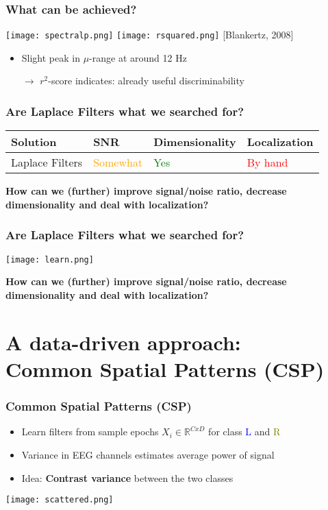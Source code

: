 \documentclass{beamer}
\begin{document}
\begin{frame}
\frametitle{What can be achieved?}
\texttt{[image: spectralp.png]}
\texttt{[image: rsquared.png]}
{\tiny [Blankertz, 2008]}
\begin{itemize}
 	\item Slight peak in $\mu$-range at around 12 Hz
 	\item[$\rightarrow$] $r^2$-score indicates: already useful discriminability
\end{itemize}
\end{frame}

\begin{frame}
\frametitle{Are Laplace Filters what we searched for?}

	\begin{center}
    \begin{tabular}{ | l | l | l | p{3cm} |}
    \hline
   	Solution & SNR & Dimensionality & Localization \\ \hline
    Laplace Filters & \textcolor{orange}{Somewhat} & \textcolor{green}{Yes} & \textcolor{red}{By hand} \\ \hline
    \end{tabular}
\end{center}

	{\bf How can we (further) improve signal/noise ratio, decrease dimensionality and deal with localization?}

\end{frame}

\begin{frame}
\frametitle{Are Laplace Filters what we searched for?}

	\begin{center}
   \texttt{[image: learn.png]}
\end{center}

	{\bf How can we (further) improve signal/noise ratio, decrease dimensionality and deal with localization?}

\end{frame}

\section{A data-driven approach: \\ Common Spatial Patterns (CSP)}

\begin{frame}
	\frametitle{Common Spatial Patterns (CSP)}
	\begin{itemize}
	\item Learn filters from sample epochs $X_i \in \mathds{R}^{CxD}$ for class \textcolor{blue}{L} and \textcolor{olive}{R}
	\item Variance in EEG channels estimates average power of signal
	\item Idea: {\bf Contrast variance} between the two classes
	\end{itemize}
	\texttt{[image: scattered.png]}
\end{frame}
\end{document}
